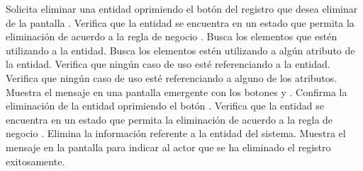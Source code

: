  \begin{UCtrayectoria}
    \UCpaso[\UCactor] Solicita eliminar una entidad oprimiendo el botón \btnEliminar del registro que desea eliminar de la pantalla .
    \UCpaso[\UCsist] Verifica que la entidad se encuentra en un estado que permita la eliminación de acuerdo a la regla de negocio . 
    \UCpaso[\UCsist] Busca los elementos que estén utilizando a la entidad.
    \UCpaso[\UCsist] Busca los elementos estén utilizando a algún atributo de la entidad.
    \UCpaso[\UCsist] Verifica que ningún caso de uso esté referenciando a la entidad. 
    \UCpaso[\UCsist] Verifica que ningún caso de uso esté referenciando a alguno de los atributos. 
    \UCpaso[\UCsist] Muestra el mensaje  en una pantalla emergente con los botones  y .
    \UCpaso[\UCactor] Confirma la eliminación de la entidad oprimiendo el botón . 
    \UCpaso[\UCsist] Verifica que la entidad se encuentra en un estado que permita la eliminación de acuerdo a la regla de negocio . 
    \UCpaso[\UCsist] Elimina la información referente a la entidad del sistema.
    \UCpaso[\UCsist] Muestra el mensaje  en la pantalla 
    para indicar al actor que se ha eliminado el registro exitosamente.
 \end{UCtrayectoria}
 
